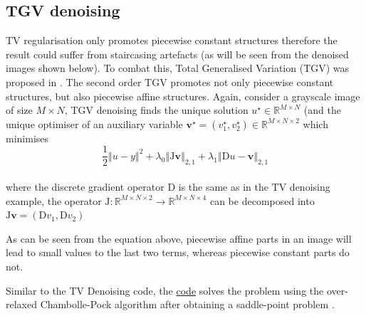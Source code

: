 \documentclass{article}
\begin{document}
\subsection*{TGV denoising} \label{sec:tgv_denoising}
TV regularisation only promotes piecewise constant structures therefore the result could suffer from staircasing artefacts (as will be seen from the denoised images shown below). To combat this, Total Generalised Variation (TGV) was proposed in \cite{bredies2010total}. The second order TGV promotes not only piecewise constant structures, but also piecewise affine structures. Again, consider a grayscale image of size \(M \times N\), TGV denoising finds the unique solution \(u^\star \in \mathbb{R}^{M \times N}\) (and the unique optimiser of an auxiliary variable \(\mathbf{v}^\star = \left( v_{1}^\star, v_{2}^\star \right) \in \mathbb{R}^{M \times N \times 2}\) which minimises \\
%
\[\frac{1}{2} \left\Vert u - y \right\Vert^{2} + \lambda_{0} \left\Vert \mathrm{J}\mathbf{v} \right\Vert_{2,1} + \lambda_{1} \left\Vert \mathrm{D}u - \mathbf{v} \right\Vert_{2,1}\]\\
%
where the discrete gradient operator \(\mathrm{D}\) is the same as in the TV denoising example, the operator \(\mathrm{J}: \mathbb{R}^{M \times N \times 2} \rightarrow \mathbb{R}^{M \times N \times 4}\) can be decomposed into \(\mathrm{J}\mathbf{v} = \left( \mathrm{D} v_1, \mathrm{D} v_2 \right)\) \cite[Sec. 7.2.]{chambolle2016introduction}

As can be seen from the equation above, piecewise affine parts in an image will lead to small values to the last two terms, whereas piecewise constant parts do not.

Similar to the TV Denoising code, the \href{https://github.com/tedyiningding/Image-Denoising/blob/main/TGVdenoise.m}{code} solves the problem using the over-relaxed Chambolle-Pock algorithm \cite[Algorithm 3.1]{condat2013primal} after obtaining a saddle-point problem \cite[Sec. 7.2.]{chambolle2016introduction}.
\end{document}
